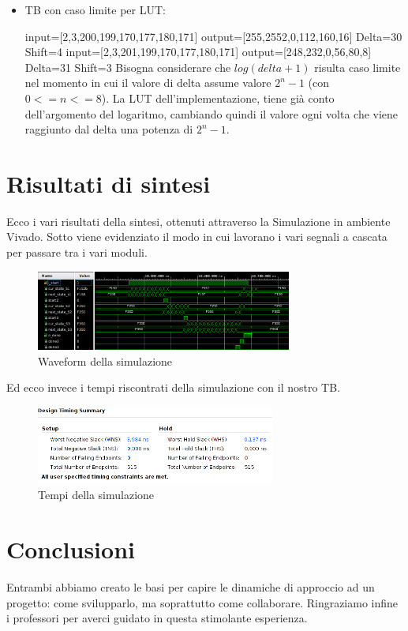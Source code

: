 \documentclass{article}
\begin{document}
\begin{itemize}
 \item TB con caso limite per LUT: 
 
  input=[2,3,200,199,170,177,180,171] 
 output=[255,2552,0,112,160,16]
 \newline
 Delta=30 Shift=4
  \newline
 input=[2,3,201,199,170,177,180,171] 
 output=[248,232,0,56,80,8]
  \newline
 Delta=31 Shift=3
  \newline
  Bisogna considerare che \(log (delta +1)\) risulta caso limite nel momento in cui il valore di delta assume valore \(2^{n}-1\) (con \(0<=n<=8\)). La LUT dell'implementazione, tiene già conto dell'argomento del logaritmo, cambiando quindi il valore ogni volta che viene raggiunto dal delta una potenza di \(2^{n}-1\).  
\end{itemize}
\section{Risultati di sintesi}
Ecco i vari risultati della sintesi, ottenuti attraverso la Simulazione in ambiente Vivado. 
Sotto viene evidenziato il modo in cui lavorano i vari segnali a cascata per passare tra i vari moduli.
\newline
\begin{figure}[h]
\centering
\includegraphics[width=0.75\textwidth]{Wave.png}
\caption{Waveform della simulazione}
\end{figure}
\break
Ed ecco invece i tempi riscontrati della simulazione con il nostro TB.
\newline
\begin{figure}[h]
\centering
\includegraphics[width=0.7\textwidth]{Time.png}
\caption{Tempi della simulazione}
\end{figure}
\break
\section{Conclusioni}
Entrambi abbiamo creato le basi per capire le dinamiche di approccio ad un progetto: come svilupparlo, ma soprattutto come collaborare. Ringraziamo infine i professori per averci guidato in questa stimolante esperienza.
\end{document}
